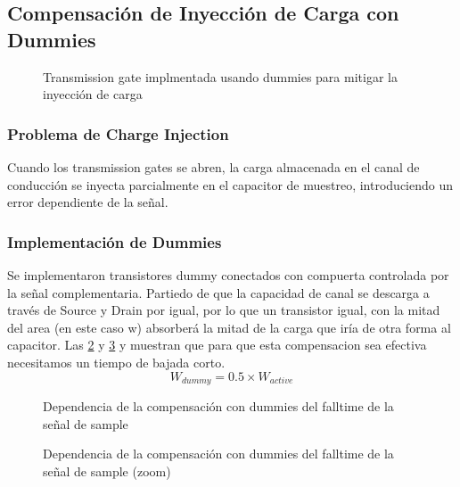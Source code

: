 \documentclass[12pt,a4paper]{report}
\begin{document}
\subsection{Compensación de Inyección de Carga con Dummies}
\begin{figure}[H]
    \centering
    
    \caption{Transmission gate implmentada usando dummies para mitigar la inyección de carga}
   \label{tgdiagdum}
\end{figure}
\subsubsection{Problema de Charge Injection}

Cuando los transmission gates se abren, la carga almacenada en el canal de conducción se inyecta parcialmente en el capacitor de muestreo, introduciendo un error dependiente de la señal.

\subsubsection{Implementación de Dummies}

Se implementaron transistores dummy conectados con compuerta controlada por la señal complementaria. Partiedo de que la capacidad de canal se descarga a través de Source y Drain por igual, por lo que un transistor igual, con la mitad del area (en este caso w) absorberá la mitad de la carga que iría de otra forma al capacitor. Las  \cref{cvssdum} y \cref{cvssdumzoom} y  muestran que para que esta compensacion sea efectiva necesitamos un tiempo de bajada corto. 
\begin{equation}
W_{dummy} = 0.5 \times W_{active}
\end{equation}

\begin{figure}[H]
    \centering
    
    \caption{Dependencia de la compensación con dummies del falltime de la señal de sample}
        \label{cvssdum}
\end{figure}
\begin{figure}[H]
    \centering
    
    \caption{Dependencia de la compensación con dummies del falltime de la señal de sample (zoom)}
        \label{cvssdumzoom}
\end{figure}
\end{document}
